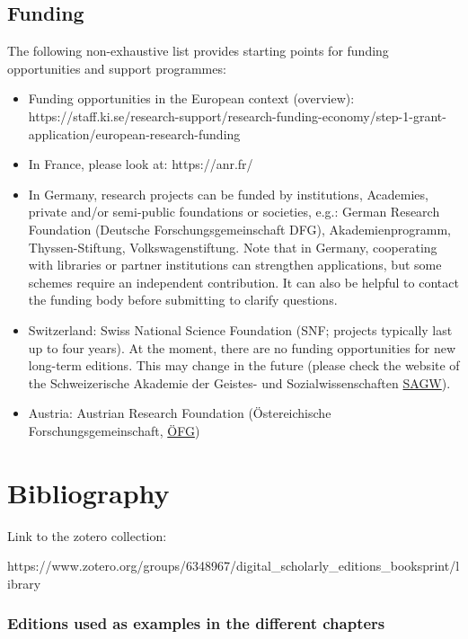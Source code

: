 \documentclass[
  letterpaper,
  DIV=11,
  numbers=noendperiod]{scrreprt}
\begin{document}
\subsection{Funding}\label{funding}

The following non-exhaustive list provides starting points for funding
opportunities and support programmes:

\begin{itemize}
\item
  Funding opportunities in the European context (overview):
  https://staff.ki.se/research-support/research-funding-economy/step-1-grant-application/european-research-funding
\item
  In France, please look at: https://anr.fr/
\item
  In Germany, research projects can be funded by institutions,
  Academies, private and/or semi-public foundations or societies, e.g.:
  German Research Foundation (Deutsche Forschungsgemeinschaft DFG),
  Akademienprogramm, Thyssen-Stiftung, Volkswagenstiftung. Note that in
  Germany, cooperating with libraries or partner institutions can
  strengthen applications, but some schemes require an independent
  contribution. It can also be helpful to contact the funding body
  before submitting to clarify questions.
\item
  Switzerland: Swiss National Science Foundation (SNF; projects
  typically last up to four years). At the moment, there are no funding
  opportunities for new long-term editions. This may change in the
  future (please check the website of the Schweizerische Akademie der
  Geistes- und Sozialwissenschaften
  \href{https://www.sagw.ch/sagw/forschungsinfrastrukturen}{SAGW}).
\item
  Austria: Austrian Research Foundation (Östereichische
  Forschungsgemeinschaft, \href{https://www.oefg.at/}{ÖFG})
\end{itemize}

\section{Bibliography}\label{bibliography-6}

Link to the zotero collection:

https://www.zotero.org/groups/6348967/digital\_scholarly\_editions\_booksprint/library

\subsubsection{Editions used as examples in the different
chapters}\label{editions-used-as-examples-in-the-different-chapters}
\end{document}

